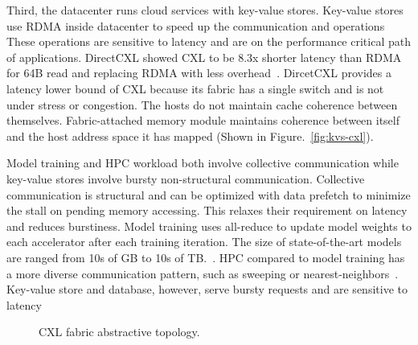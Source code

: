 Third, the datacenter runs cloud services with key-value stores.
%
Key-value stores use RDMA inside datacenter to speed up the communication and operations~\cite{farm:nsdi:2014,herd:sigcomm:2014,eRPC:nsdi:2019, xstore:osdi:2020}
%
These operations are sensitive to latency and are on the performance critical path of applications. 
%
DirectCXL showed CXL to be 8.3x shorter latency than RDMA for 64B read and replacing RDMA with less overhead~\cite{directcxl:atc:2022}. 
%
DircetCXL provides a latency lower bound of CXL because its fabric has a single switch and is not under stress or congestion.
%
The hosts do not maintain cache coherence between themselves. Fabric-attached memory module maintains coherence between itself and the host address space it has mapped (Shown in Figure.~\ref{fig:kvs-cxl}).

Model training and HPC workload both involve collective communication while key-value stores involve bursty non-structural communication.
%
Collective communication is structural and can be optimized with data prefetch to minimize the stall on pending memory accessing.
%
This relaxes their requirement on latency and reduces burstiness.
%
Model training uses all-reduce to update model weights to each accelerator after each training iteration. The size of state-of-the-art models are ranged from 10s of GB to 10s of TB.~\cite{zero:arxiv:2020, zero-infinity:sc:2021, zionex:isca:2022}.
%
HPC compared to model training has a more diverse communication pattern, such as sweeping or nearest-neighbors~\cite{mpi-usage:sc:2019, ember-comm, exascale-apps, doe-miniapps}. 
%
Key-value store and database, however, serve bursty requests and are sensitive to latency~\cite{scale-memcache:nsdi:2013, rocksdb-modeling:fast:2020}

\begin{figure}[ht!]
    \begin{subfigure}[ht]{0.8\columnwidth}
    \end{subfigure}
    \begin{subfigure}[ht]{0.8\columnwidth}
    \end{subfigure}

\caption{CXL fabric abstractive topology.}
\label{fig:cxl-topo}
\end{figure}

